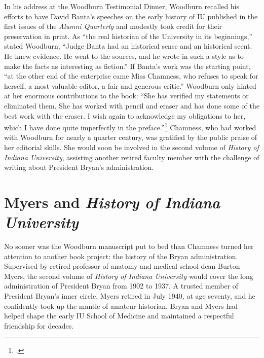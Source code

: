 \documentclass[
  american,
  letterpaper,
]{scrreprt}
\begin{document}
In his address at the Woodburn Testimonial Dinner, Woodburn recalled his
efforts to have David Banta's speeches on the early history of IU
published in the first issues of the \emph{Alumni Quarterly} and
modestly took credit for their preservation in print. As ``the real
historian of the University in its beginnings,'' stated Woodburn,
``Judge Banta had an historical sense and an historical scent. He knew
evidence. He went to the sources, and he wrote in such a style as to
make the facts as interesting as fiction.'' If Banta's work was the
starting point, ``at the other end of the enterprise came Miss Chamness,
who refuses to speak for herself, a most valuable editor, a fair and
generous critic.'' Woodburn only hinted at her enormous contributions to
the book: ``She has verified my statements or eliminated them. She has
worked with pencil and eraser and has done some of the best work with
the eraser. I wish again to acknowledge my obligations to her, which I
have done quite imperfectly in the preface.''\footnote{.} Chamness,
who had worked with Woodburn for nearly a quarter century, was gratified
by the public praise of her editorial skills. She would soon be involved
in the second volume of \emph{History of Indiana University}, assisting
another retired faculty member with the challenge of writing about
President Bryan's administration.

\section{\texorpdfstring{Myers and \emph{History of Indiana
University}}{Myers and History of Indiana University}}\label{myers-and-history-of-indiana-university}

No sooner was the Woodburn manuscript put to bed than Chamness turned
her attention to another book project: the history of the Bryan
administration. Supervised by retired professor of anatomy and medical
school dean Burton Myers, the second volume of \emph{History of Indiana
University} would cover the long administration of President Bryan from
1902 to 1937. A trusted member of President Bryan's inner circle, Myers
retired in July 1940, at age seventy, and he confidently took up the
mantle of amateur historian. Bryan and Myers had helped shape the early
IU School of Medicine and maintained a respectful friendship for
decades.
\end{document}
